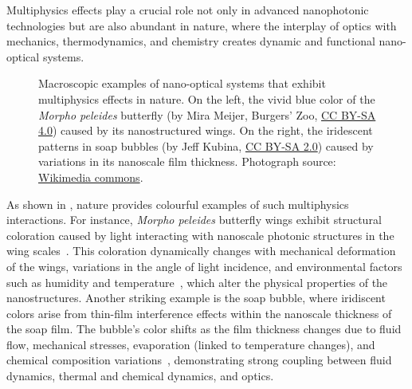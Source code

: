 Multiphysics effects play a crucial role not only in advanced nanophotonic technologies but are also abundant in nature, where the interplay of optics with mechanics, thermodynamics, and chemistry creates dynamic and functional nano-optical systems.

\begin{figure}[b!]
    \centering
    \caption{Macroscopic examples of nano-optical systems that exhibit multiphysics effects in nature. On the left, the vivid blue color of the \textit{Morpho peleides} butterfly (by Mira Meijer, Burgers' Zoo, \href{https://creativecommons.org/licenses/by-sa/4.0/}{CC BY-SA 4.0}) caused by its nanostructured wings. On the right, the iridescent patterns in soap bubbles (by Jeff Kubina, \href{https://creativecommons.org/licenses/by-sa/2.0/}{CC BY-SA 2.0}) caused by variations in its nanoscale film thickness. Photograph source: \href{https://commons.wikimedia.org/wiki/Main_Page}{Wikimedia commons}.}
    \label{fig:motivation_natural}
\end{figure}

As shown in , nature provides colourful examples of such multiphysics interactions. For instance, \textit{Morpho peleides} butterfly wings exhibit structural coloration caused by light interacting with nanoscale photonic structures in the wing scales~\cite{butterfly}. This coloration dynamically changes with mechanical deformation of the wings, variations in the angle of light incidence, and environmental factors such as humidity and temperature~\cite{morpho_temp}, which alter the physical properties of the nanostructures. 
Another striking example is the soap bubble, where iridiscent colors arise from thin-film interference effects within the nanoscale thickness of the soap film. The bubble's color shifts as the film thickness changes due to fluid flow, mechanical stresses, evaporation (linked to temperature changes), and chemical composition variations~\cite{bubble}, demonstrating strong coupling between fluid dynamics, thermal and chemical dynamics, and optics.

